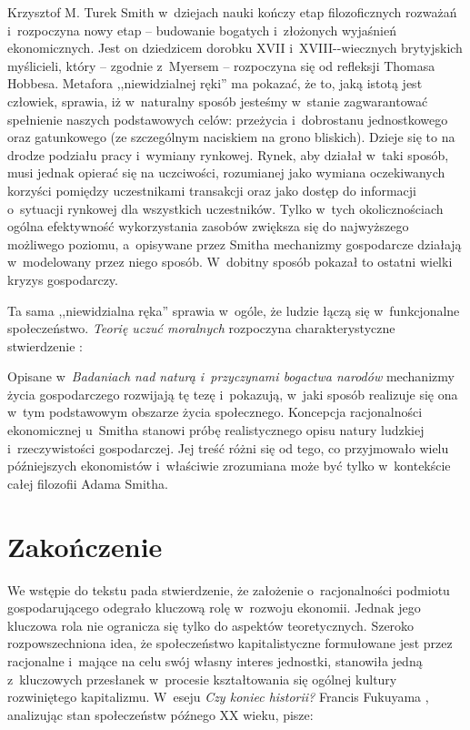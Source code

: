 \begin{artplenv}{Krzysztof M. Turek}
Smith w~dziejach nauki kończy etap filozoficznych rozważań i~rozpoczyna nowy etap -- budowanie bogatych i~złożonych
wyjaśnień ekonomicznych. Jest on dziedzicem dorobku XVII i~XVIII-\mbox{-wiecznych} brytyjskich myślicieli,
który -- zgodnie z~Myersem -- rozpoczyna się od refleksji Thomasa Hobbesa. Metafora ,,niewidzialnej ręki''
ma pokazać, że to, jaką istotą
jest człowiek, sprawia, iż w~naturalny sposób jesteśmy w~stanie zagwarantować spełnienie naszych podstawowych celów:
przeżycia i~dobrostanu jednostkowego oraz gatunkowego (ze szczególnym naciskiem na grono bliskich). Dzieje się to na
drodze podziału pracy i~wymiany rynkowej. Rynek, aby działał w~taki sposób, musi jednak opierać się na uczciwości,
rozumianej jako wymiana oczekiwanych korzyści pomiędzy uczestnikami transakcji oraz jako dostęp do
informacji o~sytuacji rynkowej dla wszystkich uczestników. Tylko w~tych okolicznościach ogólna efektywność wykorzystania zasobów
zwiększa się do najwyższego możliwego poziomu, a~opisywane przez Smitha mechanizmy gospodarcze działają w~modelowany
przez niego sposób. W~dobitny sposób pokazał to ostatni wielki kryzys gospodarczy.

Ta sama ,,niewidzialna ręka'' sprawia w~ogóle, że ludzie łączą się w~funkcjonalne społeczeństwo. \textit{Teorię uczuć
moralnych }rozpoczyna charakterystyczne stwierdzenie
\parencite[s.~5]{smith_teoria_1989}:


Opisane w~\textit{Badaniach nad naturą i~przyczynami bogactwa narodów }mechanizmy życia gospodarczego rozwijają tę tezę
i~pokazują, w~jaki sposób realizuje się ona w~tym podstawowym obszarze życia społecznego. Koncepcja racjonalności
ekonomicznej u~Smitha stanowi próbę realistycznego opisu natury ludzkiej i~rzeczywistości gospodarczej. Jej treść różni
się od tego, co przyjmowało wielu późniejszych ekonomistów i~właściwie zrozumiana może być tylko w~kontekście całej
filozofii Adama Smitha.

\section*{Zakończenie}

We wstępie do tekstu pada stwierdzenie, że założenie o~racjonalności podmiotu gospodarującego odegrało kluczową
rolę w~rozwoju ekonomii. Jednak jego kluczowa rola nie ogranicza się tylko do aspektów teoretycznych.
Szeroko rozpowszechniona
idea, że społeczeństwo kapitalistyczne formułowane jest przez racjonalne i~mające na celu swój własny interes
jednostki, stanowiła jedną z~kluczowych przesłanek w~procesie kształtowania się ogólnej kultury rozwiniętego
kapitalizmu. W~eseju \textit{Czy koniec historii?} Francis Fukuyama
\parencite*[s.~4]{fukuyama_end_1989},
analizując
stan społeczeństw późnego XX wieku, pisze: 


\end{artplenv}

